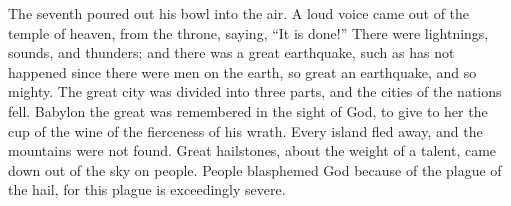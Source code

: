 {\par }{\PP {}The seventh poured out his bowl into the air. A loud voice came out of the temple of heaven, from the throne, saying, “It is done!”
There were lightnings, sounds, and thunders; and there was a great earthquake, such as has not happened since there were men on the earth, so great an earthquake, and so mighty.
The great city was divided into three parts, and the cities of the nations fell. Babylon the great was remembered in the sight of God, to give to her the cup of the wine of the fierceness of his wrath.
Every island fled away, and the mountains were not found.
Great hailstones, about the weight of a talent, came down out of the sky on people. People blasphemed God because of the plague of the hail, for this plague is exceedingly severe.

}

